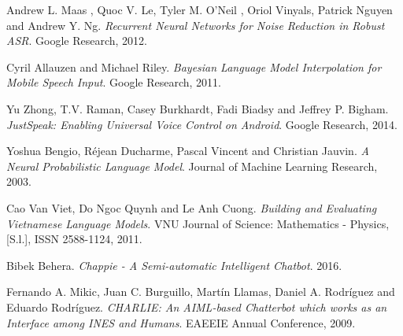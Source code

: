 \documentclass[12pt]{report}
\begin{document}
\begin{thebibliography}{9}
Andrew L. Maas , Quoc V. Le, Tyler M. O’Neil , Oriol Vinyals, Patrick Nguyen and Andrew Y. Ng. 
\textit{Recurrent Neural Networks for Noise Reduction in Robust ASR}. 
Google Research, 2012.

Cyril Allauzen and Michael Riley. 
\textit{Bayesian Language Model Interpolation for Mobile Speech Input}. 
Google Research, 2011.

Yu Zhong, T.V. Raman, Casey Burkhardt, Fadi Biadsy and Jeffrey P. Bigham. 
\textit{JustSpeak: Enabling Universal Voice Control on Android}. 
Google Research, 2014.

Yoshua Bengio, Réjean Ducharme, Pascal Vincent and Christian Jauvin. 
\textit{A Neural Probabilistic Language Model}. 
Journal of Machine Learning Research, 2003.

Cao Van Viet, Do Ngoc Quynh and Le Anh Cuong. 
\textit{Building and Evaluating Vietnamese Language Models}. 
VNU Journal of Science: Mathematics - Physics, [S.l.], ISSN 2588-1124, 2011.

Bibek Behera. 
\textit{Chappie - A Semi-automatic Intelligent Chatbot}. 
2016.

Fernando A. Mikic, Juan C. Burguillo, Martín Llamas, Daniel A. Rodríguez and Eduardo Rodríguez. 
\textit{CHARLIE: An AIML-based Chatterbot which works as an Interface among INES and Humans}. 
EAEEIE Annual Conference, 2009.

\end{thebibliography}

\end{document}
